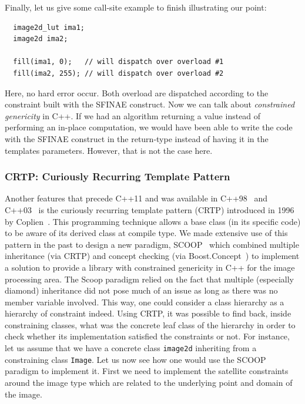 Finally, let us give some call-site example to finish illustrating our point:

\begin{verbatim}
  image2d_lut ima1;
  image2d ima2;

  fill(ima1, 0);   // will dispatch over overload #1
  fill(ima2, 255); // will dispatch over overload #2
\end{verbatim}
Here, no hard error occur. Both overload are dispatched according to the constraint built with the SFINAE construct. Now
we can talk about \emph{constrained genericity} in C++. If we had an algorithm returning a value instead of performing
an in-place computation, we would have been able to write the code with the SFINAE construct in the return-type instead
of having it in the templates parameters. However, that is not the case here.


\subsubsection{CRTP: Curiously Recurring Template Pattern}
\label{subsec:crtp}

Another features that precede C++11 and was available in C++98~\parencite{iso.1998.cpp} and
C++03~\parencite{iso.2003.cpp} is the curiously recurring template pattern (CRTP) introduced in 1996 by
Coplien~\parencite{coplien.1996.crtp}. This programming technique allows a base class (in its specific code) to be aware
of its derived class at compile type. We made extensive use of this pattern in the past to design a new paradigm,
SCOOP~\parencite{burrus.2003.mpool, geraud.2006.scoop-pres, geraud.2008.mpool, levillain.2011.phd} which combined
multiple inheritance (via CRTP) and concept checking (via
Boost.Concept~\parencite{siek.2000.concept,boost.2006.concepts}) to implement a solution to provide a library with
constrained genericity in C++ for the image processing area. The Scoop paradigm relied on the fact that multiple
(especially diamond) inheritance did not pose much of an issue as long as there was no member variable involved. This
way, one could consider a class hierarchy as a hierarchy of constraint indeed. Using CRTP, it was possible to find back,
inside constraining classes, what was the concrete leaf class of the hierarchy in order to check whether its
implementation satisfied the constraints or not. For instance, let us assume that we have a concrete class
\texttt{image2d} inheriting from a constraining class \texttt{Image}. Let us now see how one would use the SCOOP
paradigm to implement it. First we need to implement the satellite constraints around the image type which are related
to the underlying point and domain of the image.

